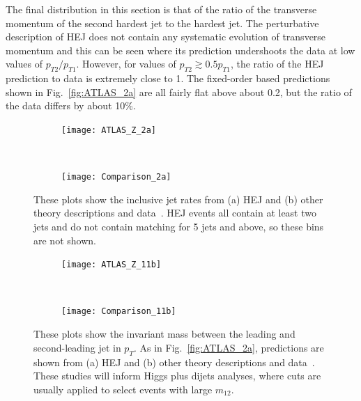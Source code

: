 	The final distribution in this section is that of the ratio of the transverse
	momentum of the second hardest jet to the hardest jet.  The perturbative
	description of HEJ does not contain any systematic evolution of transverse
	momentum and this can be seen where its prediction undershoots the data at low
	values of $p_{T2}/p_{T1}$.  However, for values of $p_{T2} \gtrsim 0.5 p_{T1}$,
	the ratio of the HEJ prediction to data is extremely close to 1.  The
	fixed-order based predictions shown in Fig.~\ref{fig:ATLAS_2a} are all fairly
	flat above about 0.2, but the ratio of the data differs by about 10\%.

	\newpage

	\begin{figure}[H]
	  \centering
	  \begin{subfigure}[b]{0.48\textwidth}
	    \texttt{[image: ATLAS\_Z\_2a]}
	    \label{fig:HEJ_ATLAS_2a}
	  \end{subfigure}
	  ~
	  \begin{subfigure}[b]{0.48\textwidth}
	    \texttt{[image: Comparison\_2a]}
	    \caption{}
	    \label{fig:MC_ATLAS_2a}
	  \end{subfigure}
	  \caption{These plots show the inclusive jet rates from (a) HEJ and (b) other
	    theory descriptions and data~\cite{Aad:2013ysa}.  HEJ events all contain at
	    least two jets and do not contain matching for 5 jets and above, so these
	    bins are not shown.}
	  \label{fig:ATLAS_2a}

	  \begin{subfigure}[b]{0.48\textwidth}
	    \texttt{[image: ATLAS\_Z\_11b]}
	    \caption{}
	    \label{fig:HEJ_ATLAS_11b}
	  \end{subfigure}
	  ~
	  \begin{subfigure}[b]{0.48\textwidth}
	    \texttt{[image: Comparison\_11b]}
	    \caption{}
	    \label{fig:MC_ATLAS_11b}
	  \end{subfigure}
	  \caption{These plots show the invariant mass between the leading and
	    second-leading jet in $p_T$.  As in Fig.~\ref{fig:ATLAS_2a}, predictions are
	    shown from (a) HEJ and (b) other theory descriptions and
	    data~\cite{Aad:2013ysa}. These studies will inform Higgs plus dijets
	    analyses, where cuts are usually applied to select events with large
	    $m_{12}$.}
	  \label{fig:ATLAS_11b}
	\end{figure}

